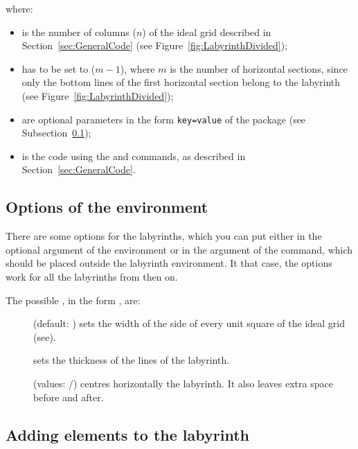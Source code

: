 \documentclass[a4paper,11pt,headinclude,footinclude]{scrartcl}
\def\ins{~}
\begin{document}
where:
\begin{itemize}
	\item {} is the number of columns ($n$) of the ideal grid described in Section\ins\ref{sec:GeneralCode} (see Figure\ins\ref{fig:LabyrinthDivided});
	\item {} has to be set to ($m-1$), where $m$ is the number of horizontal sections, since only the bottom lines of the first horizontal section belong to the labyrinth (see Figure\ins\ref{fig:LabyrinthDivided});
	\item {} are optional parameters in the form \texttt{key=value} of the  package (see Subsection\ins\ref{sec:Options});
	\item {} is the code using the  and  commands, as described in Section\ins\ref{sec:GeneralCode}.
\end{itemize}

\subsection{Options of the  environment}
\label{sec:Options}

There are some options for the labyrinths, which you can put either in the optional argument of the  environment or in the argument of the  command, which should be placed outside the labyrinth environment. It that case, the options work for all the labyrinths from then on.
\begin{code}
\end{code}

The possible , in the form , are:
\begin{description}
	\item[] (default: \othname*{11pt}) sets the width of the side of every unit square of the ideal grid (see).
	\item[] sets the thickness of the lines of the labyrinth.
	\item[] (values: /) centres horizontally the labyrinth. It also leaves extra space before and after.
\end{description}

\subsection{Adding elements to the labyrinth}
\end{document}
